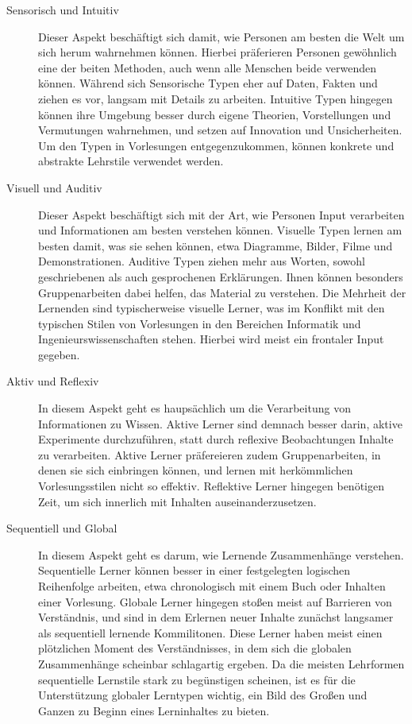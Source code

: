 \begin{description}
    \item[Sensorisch und Intuitiv] Dieser Aspekt beschäftigt sich damit, wie Personen am besten die Welt um sich herum wahrnehmen können. Hierbei präferieren Personen gewöhnlich eine der beiten Methoden, auch wenn alle Menschen beide verwenden können. Während sich Sensorische Typen eher auf Daten, Fakten und ziehen es vor, langsam mit Details zu arbeiten. Intuitive Typen hingegen können ihre Umgebung besser durch eigene Theorien, Vorstellungen und Vermutungen wahrnehmen, und setzen auf Innovation und Unsicherheiten. Um den Typen in Vorlesungen entgegenzukommen, können konkrete und abstrakte Lehrstile verwendet werden.
    \item[Visuell und Auditiv] Dieser Aspekt beschäftigt sich mit der Art, wie Personen Input verarbeiten und Informationen am besten verstehen können. Visuelle Typen lernen am besten damit, was sie sehen können, etwa Diagramme, Bilder, Filme und Demonstrationen. Auditive Typen ziehen mehr aus Worten, sowohl geschriebenen als auch gesprochenen Erklärungen. Ihnen können besonders Gruppenarbeiten dabei helfen, das Material zu verstehen. Die Mehrheit der Lernenden sind typischerweise visuelle Lerner, was im Konflikt mit den typischen Stilen von Vorlesungen in den Bereichen Informatik und Ingenieurswissenschaften stehen. Hierbei wird meist ein frontaler Input gegeben.
    \item[Aktiv und Reflexiv]  In diesem Aspekt geht es haupsächlich um die Verarbeitung von Informationen zu Wissen. Aktive Lerner sind demnach besser darin, aktive Experimente durchzuführen, statt durch reflexive Beobachtungen Inhalte zu verarbeiten. Aktive Lerner präfereieren zudem Gruppenarbeiten, in denen sie sich einbringen können, und lernen mit herkömmlichen Vorlesungsstilen nicht so effektiv. Reflektive Lerner hingegen benötigen Zeit, um sich innerlich mit Inhalten auseinanderzusetzen.
    \item[Sequentiell und Global] In diesem Aspekt geht es darum, wie Lernende Zusammenhänge verstehen. Sequentielle Lerner können besser in einer festgelegten logischen Reihenfolge arbeiten, etwa chronologisch mit einem Buch oder Inhalten einer Vorlesung. Globale Lerner hingegen stoßen meist auf Barrieren von Verständnis, und sind in dem Erlernen neuer Inhalte zunächst langsamer als sequentiell lernende Kommilitonen. Diese Lerner haben meist einen plötzlichen Moment des Verständnisses, in dem sich die globalen Zusammenhänge scheinbar schlagartig ergeben. Da die meisten Lehrformen sequentielle Lernstile stark zu begünstigen scheinen, ist es für die Unterstützung globaler Lerntypen wichtig, ein Bild des Großen und Ganzen zu Beginn eines Lerninhaltes zu bieten.
\end{description}

